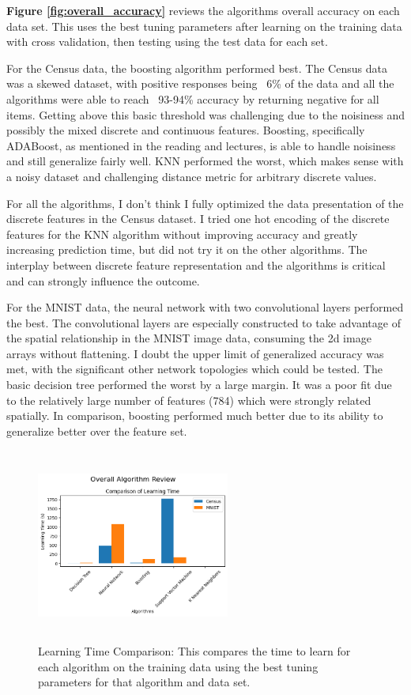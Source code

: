 \documentclass[letterpaper]{article} %
\begin{document}
\textbf{Figure \ref{fig:overall_accuracy}} reviews the algorithms overall accuracy on each data set.  This uses the best tuning parameters after learning on the training data with cross validation, then testing using the test data for each set.  
 
For the Census data, the boosting algorithm performed best.  The Census data was a skewed dataset, with positive responses being ~6\% of the data and all the algorithms were able to reach ~93-94\% accuracy by returning negative for all items.  Getting above this basic threshold was challenging due to the noisiness and possibly the mixed discrete and continuous features.  Boosting, specifically ADABoost, as mentioned in the reading and lectures, is able to handle noisiness and still generalize fairly well.  KNN performed the worst, which makes sense with a noisy dataset and challenging distance metric for arbitrary discrete values.   

For all the algorithms, I don't think I fully optimized the data presentation of the discrete features in the Census dataset.  I tried one hot encoding of the discrete features for the KNN algorithm without improving accuracy and greatly increasing prediction time, but did not try it on the other algorithms.  The interplay between discrete feature representation and the algorithms is critical and can strongly influence the outcome.
 
For the MNIST data, the neural network with two convolutional layers performed the best.  The convolutional layers are especially constructed to take advantage of the spatial relationship in the MNIST image data, consuming the 2d image arrays without flattening.  I doubt the upper limit of generalized accuracy was met, with the significant other network topologies which could be tested.  The basic decision tree performed the worst by a large margin.  It was a poor fit due to the relatively large number of features (784) which were strongly related spatially.  In comparison, boosting performed much better due to its ability to generalize better over the feature set.
 
\begin{figure}[h]
\centering
\includegraphics[width=2.5in, height=2.5in]{figures/Overall_Algorithm_ReviewComparison_of_Learning_Time_.png}
\caption{Learning Time Comparison:  This compares the time to learn for each algorithm on the training data using the best tuning parameters for that algorithm and data set. }
\label{fig:overall_learning_time}
\end{figure}
 
\end{document}
